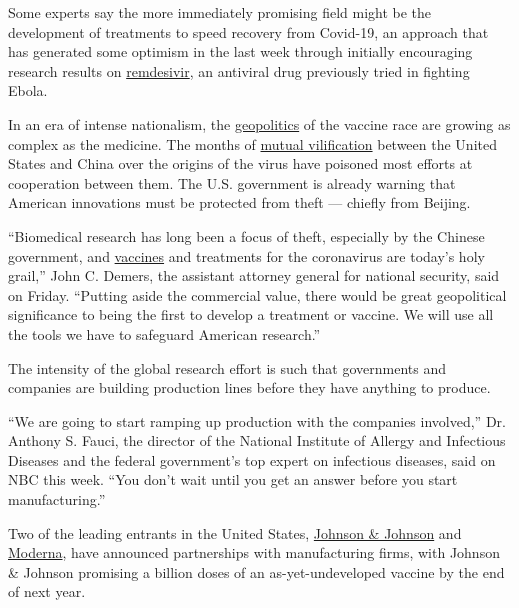 Some experts say the more immediately promising field might be the
development of treatments to speed recovery from Covid-19, an approach
that has generated some optimism in the last week through initially
encouraging research results on
\href{https://www.nytimes3xbfgragh.onion/2020/04/29/health/gilead-remdesivir-coronavirus.html}{remdesivir},
an antiviral drug previously tried in fighting Ebola.

In an era of intense nationalism, the
\href{https://www.nytimes3xbfgragh.onion/2020/03/19/us/politics/coronavirus-vaccine-competition.html}{geopolitics}
of the vaccine race are growing as complex as the medicine. The months
of
\href{https://www.nytimes3xbfgragh.onion/2020/05/01/us/politics/coronavirus-china-trump.html}{mutual
vilification} between the United States and China over the origins of
the virus have poisoned most efforts at cooperation between them. The
U.S. government is already warning that American innovations must be
protected from theft --- chiefly from Beijing.

``Biomedical research has long been a focus of theft, especially by the
Chinese government, and
\href{https://www.nytimes3xbfgragh.onion/2020/05/15/us/politics/coronavirus-vaccine-timeline.html}{vaccines}
and treatments for the coronavirus are today's holy grail,'' John C.
Demers, the assistant attorney general for national security, said on
Friday. ``Putting aside the commercial value, there would be great
geopolitical significance to being the first to develop a treatment or
vaccine. We will use all the tools we have to safeguard American
research.''

The intensity of the global research effort is such that governments and
companies are building production lines before they have anything to
produce.

``We are going to start ramping up production with the companies
involved,'' Dr. Anthony S. Fauci, the director of the National Institute
of Allergy and Infectious Diseases and the federal government's top
expert on infectious diseases, said on NBC this week. ``You don't wait
until you get an answer before you start manufacturing.''

Two of the leading entrants in the United States,
\href{https://www.nytimes3xbfgragh.onion/2020/05/19/business/johnson-baby-powder-sales-stopped.html}{Johnson
\& Johnson} and
\href{https://www.nytimes3xbfgragh.onion/2020/05/18/health/coronavirus-vaccine-moderna.html}{Moderna},
have announced partnerships with manufacturing firms, with Johnson \&
Johnson promising a billion doses of an as-yet-undeveloped vaccine by
the end of next year.


